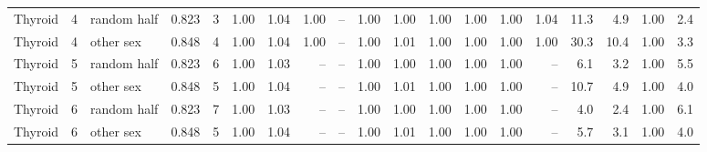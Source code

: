 \begin{table}[h]
\begin{tabular}{lllrrrrrrrrrrrrrrrr}
Thyroid & 4 & random half & 0.823 & 3 & 1.00 & 1.04 & 1.00 & -- & 1.00 & 1.00 & 1.00 & 1.00 & 1.00 & 1.04 & 11.3 & 4.9 & 1.00 & 2.4 \\
Thyroid & 4 & other sex & 0.848 & 4 & 1.00 & 1.04 & 1.00 & -- & 1.00 & 1.01 & 1.00 & 1.00 & 1.00 & 1.00 & 30.3 & 10.4 & 1.00 & 3.3 \\
Thyroid & 5 & random half & 0.823 & 6 & 1.00 & 1.03 & -- & -- & 1.00 & 1.00 & 1.00 & 1.00 & 1.00 & -- & 6.1 & 3.2 & 1.00 & 5.5 \\
Thyroid & 5 & other sex & 0.848 & 5 & 1.00 & 1.04 & -- & -- & 1.00 & 1.01 & 1.00 & 1.00 & 1.00 & -- & 10.7 & 4.9 & 1.00 & 4.0 \\
Thyroid & 6 & random half & 0.823 & 7 & 1.00 & 1.03 & -- & -- & 1.00 & 1.00 & 1.00 & 1.00 & 1.00 & -- & 4.0 & 2.4 & 1.00 & 6.1 \\
Thyroid & 6 & other sex & 0.848 & 5 & 1.00 & 1.04 & -- & -- & 1.00 & 1.01 & 1.00 & 1.00 & 1.00 & -- & 5.7 & 3.1 & 1.00 & 4.0 \\
\bottomrule
\end{tabular}
\end{table}

